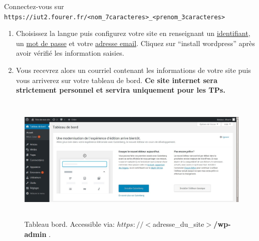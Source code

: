 \documentclass[a4paper, 8pt]{article}
\begin{document}
 \exost Connectez-vous sur \verb?https://iut2.fourer.fr/<nom_7caracteres>_<prenom_3caracteres>?
\begin{enumerate}
 \item Choisissez la langue puis configurez votre site en renseignant un \underline{identifiant}, un \underline{mot de passe} et votre \underline{adresse email}. Cliquez sur ``install wordpress'' apr\`es avoir v\'erifi\'e les information saisies. %
 \item Vous recevrez alors un courriel contenant les informations de votre site puis vous arriverez sur votre tableau de bord. \textbf{Ce site internet sera strictement personnel et servira uniquement pour les TPs.}
 \end{enumerate}
\begin{figure}[!ht]
\begin{center}
\includegraphics[height=6cm]{tableau_de_bord.jpg} %
\end{center}
\caption{Tableau bord. Accessible via: $https://<$adresse\_du\_site$>$\textbf{/wp-admin} .} %
\end{figure} %
\end{document}
